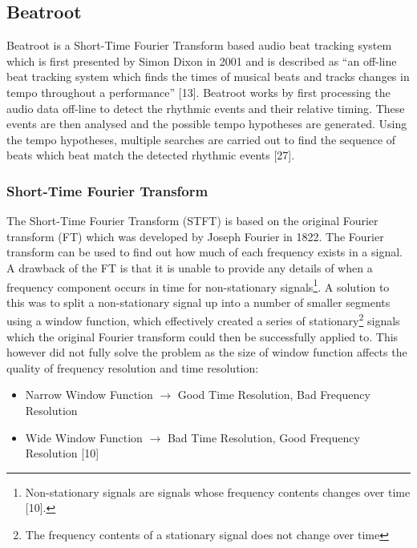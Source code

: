 \documentclass[a4paper, 11pt]{article}
\begin{document}
\subsection{Beatroot}
Beatroot is a Short-Time Fourier Transform based audio beat tracking system which is first presented by Simon Dixon in 2001 and is described as ``an off-line beat tracking system which finds the times of musical beats and tracks changes in tempo throughout a performance'' [13]. Beatroot works by first processing the audio data off-line to detect the rhythmic events and their relative timing. These events are then analysed and the possible tempo hypotheses are generated. Using the tempo hypotheses, multiple searches are carried out to find the sequence of beats which beat match the detected rhythmic events [27]. 



\subsubsection{Short-Time Fourier Transform}
The Short-Time Fourier Transform (STFT) is based on the original Fourier transform (FT) which was developed by Joseph Fourier in 1822. The Fourier transform can be used to find out how much of each frequency exists in a signal. A drawback of the FT is that it is unable to provide any details of when a frequency component occurs in time for non-stationary signals\footnote{Non-stationary signals are signals whose frequency contents changes over time [10].}. A solution to this was to split a non-stationary signal up into a number of smaller segments using a window function, which effectively created a series of stationary\footnote{The frequency contents of a stationary signal does not change over time} signals which the original Fourier transform could then be successfully applied to. This however did not fully solve the problem as the size of window function affects the quality of frequency resolution and time resolution:
\begin{itemize}
\item Narrow Window Function $\longrightarrow$  Good Time Resolution, Bad Frequency Resolution
\item Wide Window Function $\longrightarrow$  Bad Time Resolution, Good Frequency Resolution [10]
\end{itemize}
\end{document}
